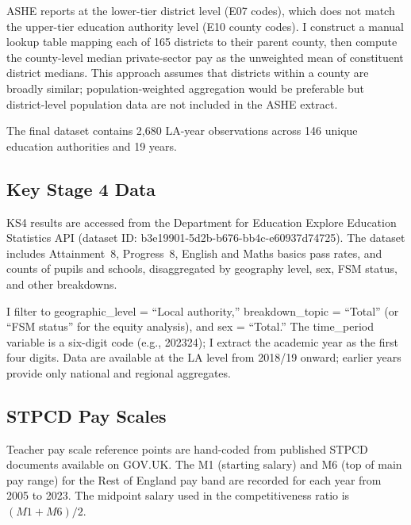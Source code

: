 \documentclass[12pt]{article}
\begin{document}
ASHE reports at the lower-tier district level (E07 codes), which does not match the upper-tier education authority level (E10 county codes). I construct a manual lookup table mapping each of 165 districts to their parent county, then compute the county-level median private-sector pay as the unweighted mean of constituent district medians. This approach assumes that districts within a county are broadly similar; population-weighted aggregation would be preferable but district-level population data are not included in the ASHE extract.

The final dataset contains 2,680 LA-year observations across 146 unique education authorities and 19 years.

\subsection{Key Stage 4 Data}

KS4 results are accessed from the Department for Education Explore Education Statistics API (dataset ID: b3e19901-5d2b-b676-bb4c-e60937d74725). The dataset includes Attainment~8, Progress~8, English and Maths basics pass rates, and counts of pupils and schools, disaggregated by geography level, sex, FSM status, and other breakdowns.

I filter to geographic\_level = ``Local authority,'' breakdown\_topic = ``Total'' (or ``FSM status'' for the equity analysis), and sex = ``Total.'' The time\_period variable is a six-digit code (e.g., 202324); I extract the academic year as the first four digits. Data are available at the LA level from 2018/19 onward; earlier years provide only national and regional aggregates.

\subsection{STPCD Pay Scales}

Teacher pay scale reference points are hand-coded from published STPCD documents available on GOV.UK. The M1 (starting salary) and M6 (top of main pay range) for the Rest of England pay band are recorded for each year from 2005 to 2023. The midpoint salary used in the competitiveness ratio is $(M1 + M6) / 2$.
\end{document}
